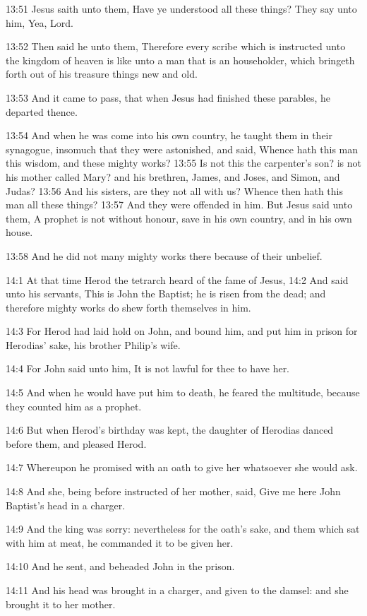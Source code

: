 13:51 Jesus saith unto them, Have ye understood all these things? They
say unto him, Yea, Lord.

13:52 Then said he unto them, Therefore every scribe which is
instructed unto the kingdom of heaven is like unto a man that is an
householder, which bringeth forth out of his treasure things new and
old.

13:53 And it came to pass, that when Jesus had finished these
parables, he departed thence.

13:54 And when he was come into his own country, he taught them in
their synagogue, insomuch that they were astonished, and said, Whence
hath this man this wisdom, and these mighty works?  13:55 Is not this
the carpenter's son? is not his mother called Mary? and his brethren,
James, and Joses, and Simon, and Judas?  13:56 And his sisters, are
they not all with us? Whence then hath this man all these things?
13:57 And they were offended in him. But Jesus said unto them, A
prophet is not without honour, save in his own country, and in his own
house.

13:58 And he did not many mighty works there because of their
unbelief.

14:1 At that time Herod the tetrarch heard of the fame of Jesus, 14:2
And said unto his servants, This is John the Baptist; he is risen from
the dead; and therefore mighty works do shew forth themselves in him.

14:3 For Herod had laid hold on John, and bound him, and put him in
prison for Herodias' sake, his brother Philip's wife.

14:4 For John said unto him, It is not lawful for thee to have her.

14:5 And when he would have put him to death, he feared the multitude,
because they counted him as a prophet.

14:6 But when Herod's birthday was kept, the daughter of Herodias
danced before them, and pleased Herod.

14:7 Whereupon he promised with an oath to give her whatsoever she
would ask.

14:8 And she, being before instructed of her mother, said, Give me
here John Baptist's head in a charger.

14:9 And the king was sorry: nevertheless for the oath's sake, and
them which sat with him at meat, he commanded it to be given her.

14:10 And he sent, and beheaded John in the prison.

14:11 And his head was brought in a charger, and given to the damsel:
and she brought it to her mother.

